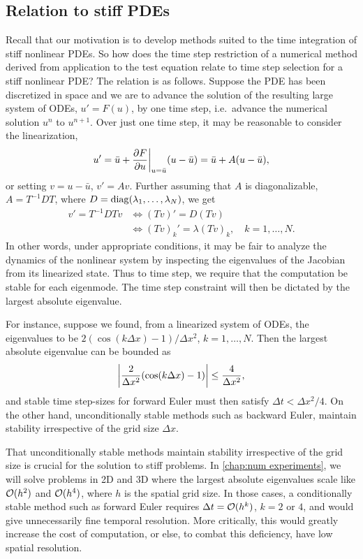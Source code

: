 \subsection{Relation to stiff PDEs}
Recall that our motivation is to develop methods suited to the time integration of stiff nonlinear PDEs. So how does the time step restriction of a numerical method derived from application to the test equation relate to time step selection for a stiff nonlinear PDE? The relation is as follows. Suppose the PDE has been discretized in space and we are to advance the solution of the resulting large system of ODEs, $u' = F(u)$, by one time step, i.e.\ advance the numerical solution $u^n$ to $u^{n+1}$. Over just one time step, it may be reasonable to consider the linearization, 
\begin{align*}
        u' = \bar u + \frac{\partial F}{\partial u} \bigg|_{u=\bar u} (u-\bar u)
= \bar u + A(u-\bar u), 
\end{align*}
or setting $v=u-\bar u$, $v' = Av$. Further assuming that $A$ is diagonalizable, $A=T^{-1}DT$, where $D=\operatorname{diag}(\lambda_1,\dots,\lambda_N)$, we get 
\begin{align}
        v' = T^{-1}DTv 
&\iff (Tv)' = D(Tv)
\\&\iff (Tv)_k' = \lambda (Tv)_k, \quad k=1,\dots, N.
\end{align}
In other words, under appropriate conditions, it may be fair to analyze the dynamics of the nonlinear system by inspecting the eigenvalues of the Jacobian from its linearized state. Thus to time step, we require that the computation be stable for each eigenmode. The time step constraint will then be dictated by the largest absolute eigenvalue.

For instance, suppose we found, from a linearized system of ODEs, the eigenvalues to be $2(\cos(k\Delta x) -1)/\Delta x^2$, $k=1,\dots,N$. Then the largest absolute eigenvalue can be bounded as 
\begin{align}
    \left|\frac{2}{\Delta x^2}(\cos(k\Delta x) -1)\right| \leq \frac{4}{\Delta x^2},
\end{align}
and stable time step-sizes for forward Euler must then satisfy $\Delta t < \Delta x^2/4$. On the other hand, unconditionally stable methods such as backward Euler, maintain stability irrespective of the grid size $\Delta x$.

That unconditionally stable methods maintain stability irrespective of the grid size is crucial for the solution to stiff problems. In \cref{chap:num experiments}, we will solve problems in 2D and 3D where the largest absolute eigenvalues scale like $\mathcal{O}(h^2)$ and $\mathcal{O}(h^4)$, where $h$ is the spatial grid size. In those cases, a conditionally stable method such as forward Euler requires $\Delta t = \mathcal{O}(h^k)$, $k= 2$ or $4$, and would give unnecessarily fine temporal resolution.  More critically, this would greatly increase the cost of computation, or else, to combat this deficiency, have low spatial resolution.

